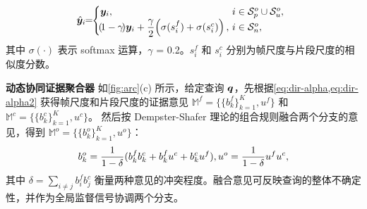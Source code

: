 \vspace{-.5em}
\begin{equation}
   \!\!\! \hat{\boldsymbol{y}}_i \!\!=\!\!
    \begin{cases}
        \boldsymbol{y}_i, \!\!& \!\!i \in \mathcal{S}^o_p \cup \mathcal{S}^o_u, \\
        \!(\!1-\gamma\!) \boldsymbol{y}_i
        + \dfrac{\gamma}{2}\!\left(\sigma(s^f_i) + \sigma(s^c_i)\right), \!\!
        & \!\!i \in \mathcal{S}^o_n ,
    \end{cases}
    \label{eq:ref_label}
\vspace{-.5em}
\end{equation}
其中 $\sigma(\cdot)$ 表示 softmax 运算，$\gamma$ = 0.2。$s^f_i$ 和 $s^c_i$ 分别为帧尺度与片段尺度的相似度分数。

\noindent \textbf{动态协同证据聚合器} \quad 如\cref{fig:arc}(c) 所示，给定查询 $\bm{q}$，先根据\cref{eq:dir-alpha,eq:dir-alpha2} 获得帧尺度和片段尺度的证据意见 $\mathbb{M}^f = \big\{\{b_k^f\}_{k=1}^{K}, u^f\big\}$ 和 $\mathbb{M}^c = \big\{\{b_k^c\}_{k=1}^{K}, u^c\big\}$。
然后按 Dempster-Shafer 理论的组合规则融合两个分支的意见，得到 $\mathbb{M}^o = \big\{\{b_k^o\}_{k=1}^{K}, u^o\big\}$：
\vspace{-.5em}
\begin{equation}
b^o_{k}=\frac{1}{1-\delta}( b^f_kb^c_k + b^f_ku^c + b^c_ku^f), u^o = \frac{1}{1-\delta}u^fu^c,
\vspace{-.5em}
\end{equation}
其中 $\delta = \sum_{i\neq j}{b^f_i b^c_j}$ 衡量两种意见的冲突程度。融合意见可反映查询的整体不确定性，并作为全局监督信号协调两个分支。

